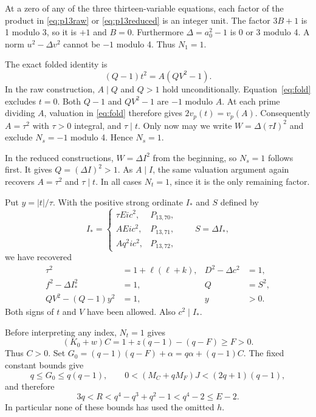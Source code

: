 At a zero of any of the three thirteen-variable equations, each factor
of the product in \eqref{eq:p13raw} or \eqref{eq:p13reduced} is an integer
unit. The factor $3B+1$ is 1 modulo 3, so it is $+1$ and $B=0$.
Furthermore $\Delta=a_0^2-1$ is 0 or 3 modulo 4. A norm
$u^2-\Delta v^2$ cannot be $-1$ modulo 4. Thus $N_1=1$.

The exact folded identity is
\begin{equation}\label{eq:fold}
 (Q-1)t^2=A(QV^2-1).
\end{equation}
In the raw construction, $A\mid Q$ and $Q>1$ hold unconditionally.
Equation~\eqref{eq:fold} excludes $t=0$. Both $Q-1$ and $QV^2-1$
are $-1$ modulo $A$. At each prime dividing $A$, valuation in
\eqref{eq:fold} therefore gives
$2v_p(t)=v_p(A)$. Consequently $A=\tau^2$ with $\tau>0$ integral,
and $\tau\mid t$. Only now may we write
$W=\Delta(\tau I)^2$ and exclude $N_s=-1$ modulo 4. Hence $N_s=1$.

In the reduced constructions, $W=\Delta I^2$ from the beginning, so
$N_s=1$ follows first. It gives $Q=(\Delta I)^2>1$. As $A\mid I$,
the same valuation argument again recovers $A=\tau^2$ and $\tau\mid t$.
In all cases $N_t=1$, since it is the only remaining factor.

Put $y=|t|/\tau$. With the positive strong ordinate $I_*$ and $S$ defined by
\[
 I_*=
 \begin{cases}
   \tau Ei c^2,&P_{13,70},\\
   AEi c^2,&P_{13,71},\\
   Aq^2i c^2,&P_{13,72},
 \end{cases}
 \qquad S=\Delta I_*,
\]
we have recovered
\begin{align}
 \tau^2&=1+\ell(\ell+k),& D^2-\Delta c^2&=1,\label{eq:firstmain}\\
 f^2-\Delta I_*^2&=1,&Q&=S^2,\label{eq:strong}\\
 QV^2-(Q-1)y^2&=1,&y&>0.\label{eq:aux}
\end{align}
Both signs of $t$ and $V$ have been allowed. Also $c^2\mid I_*$.

Before interpreting any index, $N_t=1$ gives
\[
 (K_0+w)C=1+z(q-1)-(q-F)\ge F>0.
\]
Thus $C>0$. Set $G_0=(q-1)(q-F)+\alpha=q\alpha+(q-1)C$.
The fixed constant bounds give
\[
 q\le G_0\le q(q-1),\qquad
 0<(M_C+qM_F)J<(2q+1)(q-1),
\]
and therefore
\begin{equation}\label{eq:Rbounds}
 3q<R<q^4-q^3+q^2-1<q^4-2\le E-2.
\end{equation}
In particular none of these bounds has used the omitted $h$.

